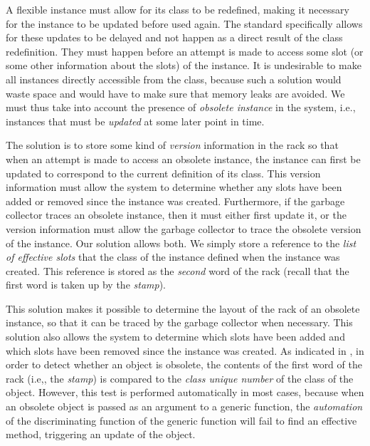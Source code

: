 A flexible instance must allow for its class to be redefined, making
it necessary for the instance to be updated before used again.  The
standard specifically allows for these updates to be delayed and not
happen as a direct result of the class redefinition.  They must happen
before an attempt is made to access some slot (or some other
information about the slots) of the instance.  It is undesirable to
make all instances directly accessible from the class, because
such a solution would waste space and would have to make sure that
memory leaks are avoided.  We must thus take into account the presence
of \emph{obsolete instance} in the system, i.e., instances that must
be \emph{updated} at some later point in time.

The solution is to store some kind of \emph{version} information in
the rack so that when an attempt is made to access an
obsolete instance, the instance can first be updated to correspond to
the current definition of its class.  This version information must
allow the system to determine whether any slots have been added or
removed since the instance was created.  Furthermore, if the garbage
collector traces an obsolete instance, then it must either first
update it, or the version information must allow the garbage collector
to trace the obsolete version of the instance.  Our solution allows
both.  We simply store a reference to the \emph{list of effective
  slots} that the class of the instance defined when the instance was
created.  This reference is stored as the \emph{second} word of the
rack (recall that the first word is taken up by the
\emph{stamp}). 

This solution makes it possible to determine the layout of the
rack of an obsolete instance, so that it can be traced by
the garbage collector when necessary.  This solution also allows the
system to determine which slots have been added and which slots have
been removed since the instance was created.  As indicated in
, in order to detect
whether an object is obsolete, the contents of the first word of the
rack (i.e,, the \emph{stamp}) is compared to the
\emph{class unique number} of the class of the object.  However, this
test is performed automatically in most cases, because when an
obsolete object is passed as an argument to a generic function, the
\emph{automation} of the discriminating function of the generic
function will fail to find an effective method, triggering an update
of the object.

